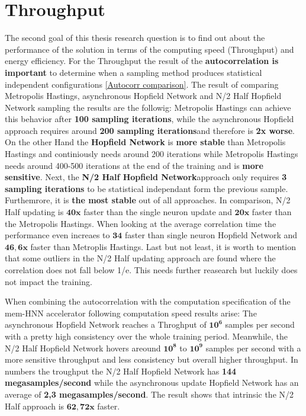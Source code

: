 \section{Throughput}

The second goal of this thesis research question is to find out about the performance of the solution in terms of the 
computing speed (Throughput) and energy efficiency. 
For the Throughput the result of the \textbf{autocorrelation is important} to determine when a sampling method produces statistical independent configurations \ref{Autocorr comparison}.
The result of comparing Metropolis Hastings, asynchronous Hopfield Network and N/2 Half Hopfield Network sampling the results are the followig:
Metropolis Hastings can achieve this behavior after \textbf{100 sampling iterations}, while the asynchronous Hopfield approach requires around \textbf{200 sampling iterations}and therefore 
is \textbf{2x worse}. On the other Hand the \textbf{Hopfield Network} is \textbf{more stable} than Metropolis Hastings and continiously needs around 200 iterations 
while Metropolis Hastings needs around 400-500 iterations at the end of the training and is \textbf{more sensitive}. 
Next, the \textbf{N/2 Half Hopfield Network}approach only requires \textbf{3 sampling iterations} to be statistical independant form the previous sample.
Furthemrore, it is \textbf{the most stable} out of all approaches. In comparison, N/2 Half updating is \(\mathbf{40x}\) faster than the single neuron
update and \(\mathbf{20x}\) faster than the Metropolis Hastings. 
When looking at the average correlation time the performance even increaes to \(\mathbf{34}\) faster than single neuron Hopfield Network and \(\mathbf{46,6x}\)
faster than Metroplis Hastings.
Last but not least, it is worth to mention that some outliers in the N/2 Half updating approach are found where 
the correlation does not fall below 1/e. This needs further reasearch but luckily does not impact the training. 

When combining the autocorrelation with the computation specification of the \ac{mem-HNN} accelerator following computation speed results arise:
The asynchronous Hopfield Network reaches a Throghput of \(\mathbf{10^6}\) samples per second with a pretty high
consistency over the whole training period. Meanwhile, the N/2 Half Hopfield Network 
hovers areound \(\mathbf{10^8}\) to \(\mathbf{10^9}\) samples per second with a more sensitive throughput and less consistency 
but overall higher throughput.
In numbers the troughput the N/2 Half Hopfield Network has \textbf{144 megasamples/second} while the asynchronous update Hopfield Network has an average of \textbf{2,3 megasamples/second}.
The result shows that intrinsic the N/2 Half approach is \(\mathbf{62,72x}\) faster. 

